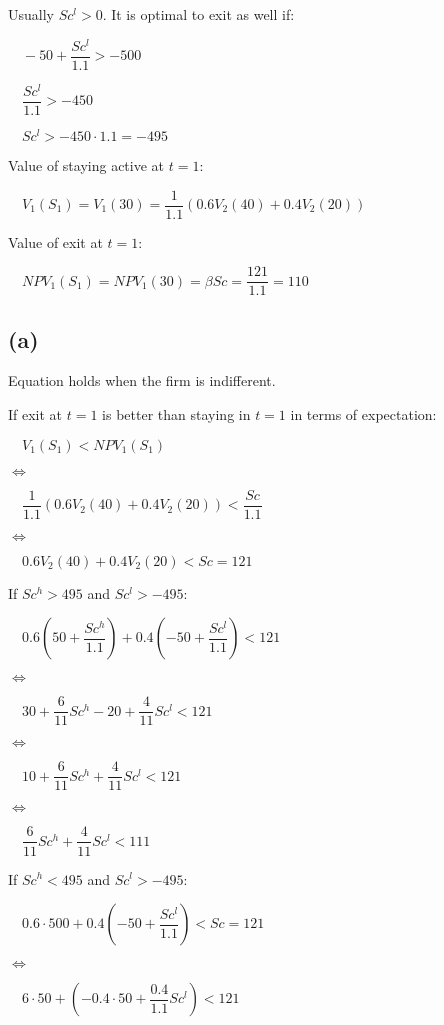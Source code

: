 \documentclass{article}
\begin{document}
Usually $Sc^{l}>0$. It is optimal to exit as well if: 

$\quad -50+\dfrac{Sc^{l}}{1.1}>-500$

$\quad \dfrac{Sc^{l}}{1.1}>-450$

$\quad Sc^{l}>-450\cdot1.1=-495$

Value of staying active at $t=1$:

$\quad V_{1}\left(S_{1}\right)=V_{1}\left(30\right)=\dfrac{1}{1.1}\left(0.6V_{2}\left(40\right)+0.4V_{2}\left(20\right)\right)$

Value of exit at $t=1$:

$\quad NPV_{1}\left(S_{1}\right)=NPV_{1}\left(30\right)=\beta Sc=\dfrac{121}{1.1}=110$

\subsection*{(a)}

Equation holds when the firm is indifferent.

If exit at $t=1$ is better than staying in $t=1$ in terms of expectation:

$\quad V_{1}\left(S_{1}\right)<NPV_{1}\left(S_{1}\right)$

$\iff$

$\quad \dfrac{1}{1.1}\left(0.6V_{2}\left(40\right)+0.4V_{2}\left(20\right)\right)<\dfrac{Sc}{1.1}$

$\iff$

$\quad 0.6V_{2}\left(40\right)+0.4V_{2}\left(20\right)<Sc=121$

If $Sc^{h}>495$ and $Sc^{l}>-495$:

$\quad 0.6\left(50+\dfrac{Sc^{h}}{1.1}\right)+0.4\left(-50+\dfrac{Sc^{l}}{1.1}\right)<121$

$\iff$

$\quad 30+\dfrac{6}{11}Sc^{h}-20+\dfrac{4}{11}Sc^{l}<121$

$\iff$

$\quad 10+\dfrac{6}{11}Sc^{h}+\dfrac{4}{11}Sc^{l}<121$

$\iff$

$\quad \dfrac{6}{11}Sc^{h}+\dfrac{4}{11}Sc^{l}<111$

If $Sc^{h}<495$ and $Sc^{l}>-495$:

$\quad 0.6\cdot500+0.4\left(-50+\dfrac{Sc^{l}}{1.1}\right)<Sc=121$

$\iff$

$\quad 6\cdot50+\left(-0.4\cdot50+\dfrac{0.4}{1.1}Sc^{l}\right)<121$
\end{document}
